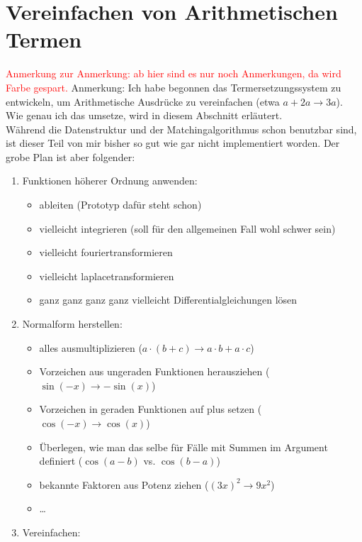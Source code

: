 \documentclass{article}
\begin{document}
\section{Vereinfachen von Arithmetischen Termen}
\begin{itshape}
\textcolor{red} {Anmerkung zur Anmerkung: ab hier sind es nur noch Anmerkungen, da wird Farbe gespart.}
Anmerkung: Ich habe begonnen das Termersetzungssystem zu entwickeln, um Arithmetische Ausdrücke zu vereinfachen (etwa $a + 2 a \rightarrow 3 a$). Wie genau ich das umsetze, wird in diesem Abschnitt erläutert.
\\Während die Datenstruktur und der Matchingalgorithmus schon benutzbar sind, ist dieser Teil von mir bisher so gut wie gar nicht implementiert worden. Der grobe Plan ist aber folgender:
\begin{enumerate}
    \item Funktionen höherer Ordnung anwenden:
    \begin{itemize}
        \item ableiten (Prototyp dafür steht schon)
        \item vielleicht integrieren (soll für den allgemeinen Fall wohl schwer sein)
        \item vielleicht fouriertransformieren
        \item vielleicht laplacetransformieren
        \item ganz ganz ganz ganz vielleicht Differentialgleichungen lösen
    \end{itemize}
    \item Normalform herstellen:
    \begin{itemize}
        \item alles ausmultiplizieren ($a\cdot (b + c) \rightarrow a\cdot b + a\cdot c$)
        \item Vorzeichen aus ungeraden Funktionen herausziehen ($\sin(-x) \rightarrow -\sin(x)$)
        \item Vorzeichen in geraden Funktionen auf plus setzen ($\cos(-x) \rightarrow \cos(x)$)
        \item Überlegen, wie man das selbe für Fälle mit Summen im Argument definiert ($\cos(a - b)$ vs. $\cos(b - a)$)
        \item bekannte Faktoren aus Potenz ziehen ($(3 x)^2 \rightarrow 9 x^2$)
        \item \dots
    \end{itemize}
    \item Vereinfachen:
    \begin{itemize}

\end{itemize}
\end{enumerate}
\end{itshape}
\end{document}

